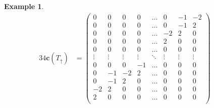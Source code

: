 \documentclass{amsart}
\theoremstyle{definition}
\newtheorem{example}[theorem]{Example}
\renewcommand{\b}[1]{{\boldsymbol{#1}}} %
\begin{document}
\begin{example}
\begin{table}
\begin{alignat*}{3}
	4\b{c}(T_\uparrow) & = \begin{pmatrix}
		0 & 0 & 0 & 0 & \dots & 0 & -1 & -2 \\
		0 & 0 & 0 & 0 & \dots & 0 & -1 & 2 \\
		0 & 0 & 0 & 0 & \dots & -2 & 2 & 0 \\
		0 & 0 & 0 & 0 & \dots & 2 & 0 & 0 \\
		0 & 0 & 0 & 0 & \dots & 0 & 0 & 0 \\
		\vdots & \vdots & \vdots & \vdots & \ddots & \vdots & \vdots & \vdots \\
		0 & 0 & 0 & -1 & \dots & 0 & 0 & 0 \\
		0 & -1 & -2 & 2 & \dots & 0 & 0 & 0 \\
		0 & -1 & 2 & 0 & \dots & 0 & 0 & 0 \\
		-2 & 2 & 0 & 0 & \dots & 0 & 0 & 0 \\
		2 & 0 & 0 & 0 & \dots & 0 & 0 & 0 \\
	\end{pmatrix}
	\quad &

\end{alignat*}
\end{table}
\end{example}
\end{document}

